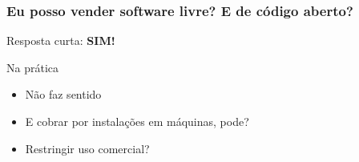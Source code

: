 \documentclass[xcolor=dvipsnames]{beamer}
\begin{document}
\begin{frame}
	\frametitle{Eu posso vender software livre? E de código aberto?}
Resposta curta: \textbf{SIM!}
\vspace{0.3cm}
\begin{block}{Na prática}
\begin{itemize}
\item Não faz sentido%
 
\item E cobrar por instalações em máquinas, pode?%
\item Restringir uso comercial?
\end{itemize}
\end{block}

\end{frame}
\end{document}
